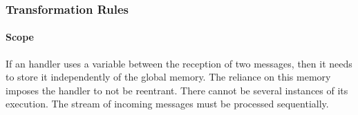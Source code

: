 \subsubsection{Transformation Rules}

\begin{figure}%
  \centering{}%
\end{figure}

\paragraph{Scope}
If an handler uses a variable between the reception of two messages, then it needs to store it independently of the global memory.
The reliance on this memory imposes the handler to not be reentrant.
There cannot be several instances of its execution.
The stream of incoming messages must be processed sequentially.

